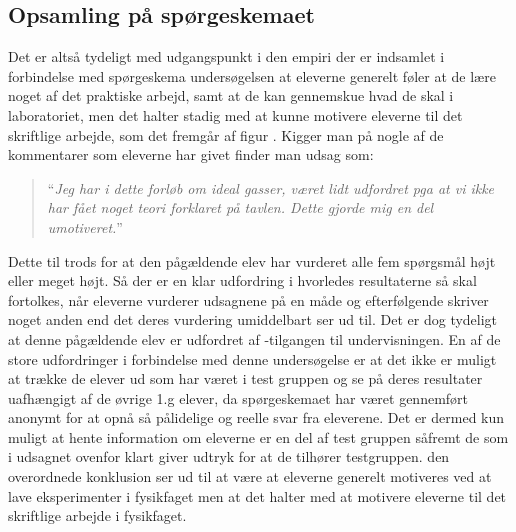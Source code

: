 \subsection*{Opsamling på spørgeskemaet}
Det er altså tydeligt med udgangspunkt i den empiri der er indsamlet i forbindelse med spørgeskema undersøgelsen at eleverne generelt føler at de lære noget af det praktiske arbejd, samt at de kan gennemskue hvad de skal i laboratoriet, men det halter stadig med at kunne motivere eleverne til det skriftlige arbejde, som det fremgår af figur .
Kigger man på nogle af de kommentarer som eleverne har givet finder man udsag som:
\begin{quote}
	``\emph{Jeg har i dette forløb om ideal gasser, været lidt udfordret pga at vi ikke har fået noget teori forklaret på tavlen. Dette gjorde mig en del umotiveret.}''
\end{quote}
Dette til trods for at den pågældende elev har vurderet alle fem spørgsmål højt eller meget højt. Så der er en klar udfordring i hvorledes resultaterne så skal fortolkes, når eleverne vurderer udsagnene på en måde og efterfølgende skriver noget anden end det deres vurdering umiddelbart ser ud til. Det er dog tydeligt at denne pågældende elev er udfordret af \ib{}-tilgangen til undervisningen.
En af de store udfordringer i forbindelse med denne undersøgelse er at det ikke er muligt at trække de elever ud som har været i test gruppen og se på deres resultater uafhængigt af de øvrige 1.g elever, da spørgeskemaet har været gennemført anonymt for at opnå så pålidelige og reelle svar fra eleverene. Det er dermed kun muligt at hente information om eleverne er en del af test gruppen såfremt de som i udsagnet ovenfor klart giver udtryk for at de tilhører testgruppen. den overordnede konklusion ser ud til at være at eleverne generelt motiveres ved at lave eksperimenter i fysikfaget men at det halter med at motivere eleverne til det skriftlige arbejde i fysikfaget.  

